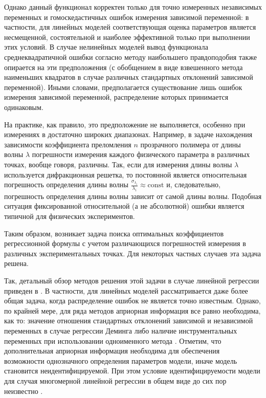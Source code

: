 \documentclass[tikz,10pt,a4paper]{article}
\begin{document}
Однако данный функционал корректен только для точно измеренных независимых
переменных и гомоскедастичных ошибок измерения зависимой переменной:
в частности, для линейных моделей соответствующая оценка параметров является
несмещенной, состоятельной и наиболее эффективной только при выполнении этих
условий. В случае нелинейных моделей вывод функционала среднеквадратичной
ошибки согласно методу наибольшего правдоподобия также опирается на
эти предположения (с обобщением в виде взвешенного метода наименьших
квадратов в случае различных стандартных отклонений зависимой
переменной).
Иными словами, предполагается существование лишь ошибок измерения зависимой
переменной, распределение которых принимается одинаковым.

На практике, как правило, это предположение не выполняется,
особенно при измерениях в достаточно широких диапазонах.
Например, в задаче нахождения зависимости коэффициента преломления $n$ прозрачного
полимера от длины волны $\lambda$ погрешности измерения каждого физического
параметра в различных точках, вообще говоря, различны\cite{Rudoy15MonteCarlo}.
Так, если для измерения длины волны $\lambda$ используется дифракционная
решетка, то постоянной является относительная погрешность определения длины волны
$\frac{\sigma_{\lambda_i}}{\lambda_i} \approx \text{const}$ и, следовательно,
погрешность определения длины волны зависит от самой длины волны. Подобная ситуация
фиксированной относительной (а не абсолютной) ошибки является типичной для
физических экспериментов.

Таким образом, возникает задача поиска оптимальных коэффициентов регрессионной
формулы с учетом различающихся погрешностей измерения в различных экспериментальных точках.
Для некоторых частных случаев эта задача решена.

Так, детальный обзор методов решения этой задачи
в случае линейной регрессии приведен в \cite{gillard2006historical}.
В частности, для линейных моделей рассматривается даже более общая задача,
когда распределение ошибок не является точно известным.
Однако, по крайней мере, для ряда методов априорная информация все
равно необходима, как то: значение отношения стандартных отклонений
зависимой и независимой переменных
в случае регрессии Деминга \cite{Deming1943Statistical}
либо наличие инструментальных переменных
при использовании одноименного метода \cite{Bowden1990Instrumental}.
Отметим, что дополнительная априорная информация необходима
для обеспечения возможности однозначного определения параметров
модели, иначе модель становится неидентифицируемой. При этом
условие идентифицируемости модели для случая многомерной
линейной регрессии в общем виде до сих пор неизвестно
\cite{Bekker1986Comment}.
\end{document}

